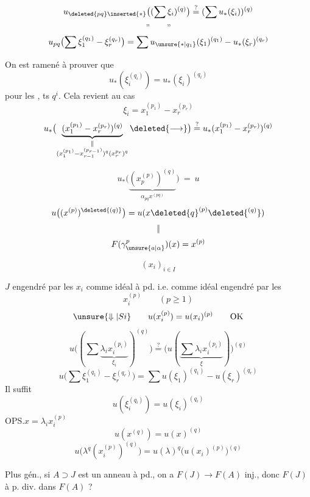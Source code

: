 \[
u_{\deleted{pq}\inserted{*}}\bigl((\sum\xi_i)^{(q)}\bigr)
\overset{?}{=}(\sum u_*(\xi_i))^{(q)}
\]
\[\text{''}\qquad\text{''}\]
\[
u_{pq}\bigl(\sum\xi_1^{(q_1)}-\xi_r^{(q_r)}\bigr)
=\sum u_{\unsure{*|q_1}}(\xi_1)^{(q_1)}-u_*(\xi_r)^{(q_r)}
\]

On est ramené à prouver que
\[
u_*(\xi_i^{(q_i)})=u_*(\xi_i)^{(q_i)}
\]
pour les , ts $q^i$.
Cela revient au cas
\[
\xi_i=x_1^{(p_1)}-x_r^{(p_r)}
\]
\[
u_*\bigl(\underbrace{(x_1^{(p_1)}-x_r^{(p_r)})^{(q)}}_{\substack{\Vert\\(x_1^{(p_1)}-x_{r-1}^{(p_{r-1})})^q(x_r^{p_r})^q}}\deleted{\longrightarrow}\bigr)
\overset{?}{=}u_*(x_1^{(p_1)}-x_r^{(p_r)})^{(q)}
\]

\[
u_*\bigl(\underbrace{(x_{p}^{(p)})^{(q)}}_{\alpha_{pq}x^{(pq)}}\bigr)\ =\ u
\]
\[
u\bigl((x^{(p)})^{\deleted{(q)}}\bigr)
=u(x\deleted{q}^{(p)}\deleted{^{(q)}})
\]
\[\Vert\]
\[
F(\gamma_{\unsure{a|\alpha}}^p)(x)=x^{(p)}
\]

\[(x_i)_{i\in I}\]

$J$ engendré par les $x_i$ comme idéal à pd.
i.e. comme idéal engendré par les
\[
x_i^{(p)}\qquad(p\geq1)
\]
\[
\unsure{\Downarrow|Si}\qquad u(x_i^{(p)})=u(x_i)^{(p)}\qquad\mathrm{OK}
\]
\[
u\bigl((\sum\underbrace{\lambda_i x_i^{(p_i)}}_{\xi_i})^{(q)}\bigr)
\overset{?}{=}\bigl(u(\underbrace{\sum\lambda_i x_i^{(p_i)}}_{\xi})\bigr)^{(q)}
\]
\[
u\bigl(\sum\xi_1^{(q_1)}-\xi_r^{(q_r)}\bigr)
=\sum u(\xi_1)^{(q_1)}-u(\xi_r)^{(q_r)}
\]
Il suffit
\[
u(\xi_i^{(q_i)})=u(\xi_i)^{(q_i)}
\]
OPS.\quad $x=\lambda_i x_i^{(p)}$
\[
u(x^{(q)})=u(x)^{(q)}
\]
\[
u\bigl(\lambda^q(x_i^{(p)})^{(q)}\bigr)
=u(\lambda)^q\bigl(u(x_i)^{(p)}\bigr)^{(q)}
\]


Plus gén., si $A\supset J$ est un anneau à pd., on a $F(J)\longrightarrow F(A)$ inj., donc $F(J)$ à p. div. dans $F(A)$ ?


